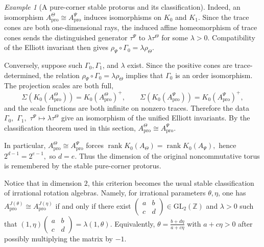 \documentclass[11pt]{amsart}
\theoremstyle{definition}
\theoremstyle{remark}
\newtheorem{example}[theorem]{Example}
\newcommand{\Z}{\mathbb{Z}}
\newcommand{\GL}{\mathrm{GL}}
\newcommand{\ex}{\mathrm{pro}}
\begin{document}
\begin{example}[A pure-corner stable protorus and its classification]
Indeed, an isomorphism $A_{\ex}^{\Theta}\cong A_{\ex}^{\Psi}$
induces isomorphisms on $K_0$ and $K_1$. Since the trace cones are both
one-dimensional rays, the induced affine homeomorphism of trace cones sends
the distinguished generator $\tau^\Psi$ to $\lambda\tau^\Theta$ for some
$\lambda>0$. Compatibility of the Elliott invariant then gives $\rho_\Psi\circ\Gamma_0=\lambda\rho_\Theta.$

Conversely, suppose such $\Gamma_0,\Gamma_1$, and $\lambda$ exist. Since
the positive cones are trace-determined, the relation $\rho_\Psi\circ\Gamma_0=\lambda\rho_\Theta$
implies that $\Gamma_0$ is an order isomorphism. The projection scales are
both full,
\[
\Sigma(K_0(A_{\ex}^{\Theta}))=K_0(A_{\ex}^{\Theta})^+,
\qquad
\Sigma(K_0(A_{\ex}^{\Psi}))=K_0(A_{\ex}^{\Psi})^+,
\]
and the scale functions are both infinite on nonzero traces. Therefore the data $\Gamma_0,$ $\Gamma_1,$
$\tau^\Psi\mapsto \lambda\tau^\Theta$
give an isomorphism of the unified Elliott invariants. By the classification
theorem used in this section, $A_{\ex}^{\Theta}\cong A_{\ex}^{\Psi}.$

In particular, $A_{\ex}^{\Theta}\cong A_{\ex}^{\Psi}$ forces $\operatorname{rank}K_0(A_\Theta)=\operatorname{rank}K_0(A_\Psi),$
hence $2^{d-1}=2^{e-1},$
so $d=e$. Thus the dimension of the original noncommutative torus is remembered
by the stable pure-corner protorus.

Notice that in dimension $2$, this criterion becomes the usual stable classification of
irrational rotation algebras. Namely, for irrational parameters
$\theta,\eta$, one has $A_{\ex}^{J(\theta)}\cong A_{\ex}^{J(\eta)}$
if and only if there exist $\begin{pmatrix}
a&b\\
c&d
\end{pmatrix}
\in \GL_2(\Z)$
and $\lambda>0$ such that
$(1,\eta)
\begin{pmatrix}
a&b\\
c&d
\end{pmatrix}
=
\lambda(1,\theta).$
Equivalently, $
\theta=\frac{b+d\eta}{a+c\eta}$
with $a+c\eta>0$
after possibly multiplying the matrix by $-1$.
\end{example}
\end{document}
